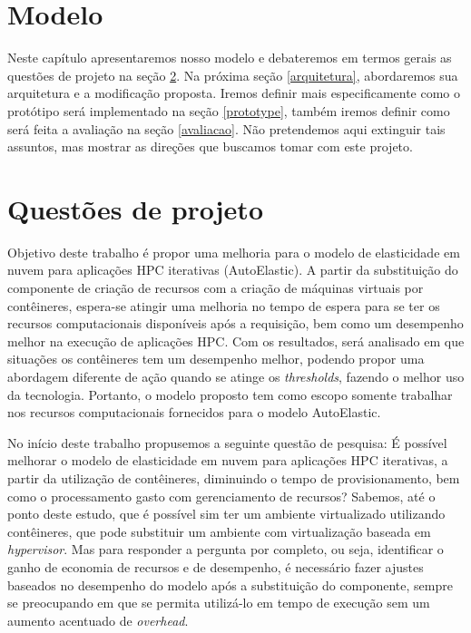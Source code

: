 \documentclass[twoside,english,brazilian]{UNISINOSartigo}
\begin{document}
\begin{itemize}
\section{Modelo}
\label{model}

Neste capítulo apresentaremos nosso modelo e debateremos em termos gerais as questões de projeto na seção \ref{questao}. Na próxima seção \ref{arquitetura}, abordaremos sua arquitetura e a modificação proposta. Iremos definir mais especificamente como o protótipo será implementado na seção \ref{prototype}, também iremos definir como será feita a avaliação na seção \ref{avaliacao}. Não pretendemos aqui extinguir tais assuntos, mas mostrar as direções que buscamos tomar com este projeto.


\section{Questões de projeto}
\label{questao}

Objetivo deste trabalho é propor uma melhoria para o modelo de elasticidade em nuvem para aplicações HPC iterativas (AutoElastic). A partir da substituição do componente de criação de recursos com a criação de máquinas virtuais por contêineres, espera-se atingir uma melhoria no tempo de espera para se ter os recursos computacionais disponíveis após a requisição, bem como um desempenho melhor na execução de aplicações HPC. Com os resultados, será analisado em que situações os contêineres tem um desempenho melhor, podendo propor uma abordagem diferente de ação quando se atinge os \textit{thresholds}, fazendo o melhor uso da tecnologia. Portanto, o modelo proposto tem como escopo somente trabalhar nos recursos computacionais fornecidos para o modelo AutoElastic. 


No início deste trabalho propusemos a seguinte questão de pesquisa: É possível melhorar o modelo de elasticidade em nuvem para aplicações HPC iterativas, a partir da utilização de contêineres, diminuindo o tempo de provisionamento, bem como o processamento gasto com gerenciamento de recursos? Sabemos, até o ponto deste estudo, que é possível sim ter um ambiente virtualizado utilizando contêineres, que pode substituir um ambiente com virtualização baseada em \textit{hypervisor}. Mas para responder a pergunta por completo, ou seja, identificar o ganho de economia de recursos e de desempenho, é necessário fazer ajustes baseados no desempenho do modelo após a substituição do componente, sempre se preocupando em que se permita utilizá-lo em tempo de execução sem um aumento acentuado de \textit{overhead}. 


\end{itemize}
\end{document}
